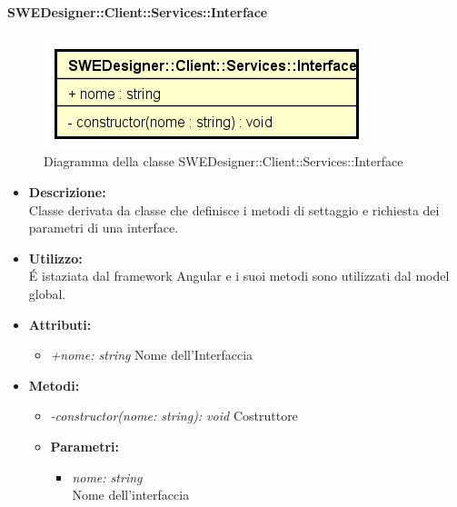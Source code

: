           	\paragraph{SWEDesigner::Client::Services::Interface}
          	\begin{figure}[h!]
			\centering
			\includegraphics[scale=0.8]{Classi/SWEDesigner__Client__Services__Interface.png}
			\caption{Diagramma della classe SWEDesigner::Client::Services::Interface}
 			\end{figure}
				\begin{itemize}
          			\item \textbf{Descrizione:}\\
          			Classe derivata da classe che definisce i metodi di settaggio e richiesta dei parametri di una interface.
          			\item \textbf{Utilizzo:}\\
          			É istaziata dal framework Angular e i suoi metodi sono utilizzati dal model global.
          			\item \textbf{Attributi:}\\
          			\begin{itemize}
          				\item \emph{+nome: string}
          				Nome dell'Interfaccia
          			\end{itemize}
          			\item \textbf{Metodi:}\\
          			\begin{itemize}
          				\item \emph{-constructor(nome: string): void}
          				Costruttore
          				\item \textbf{Parametri:}\\
            				\begin{itemize}
            					\item \emph{nome: string}\\
            					Nome dell'interfaccia
            				\end{itemize}
          			\end{itemize}
          		\end{itemize}
